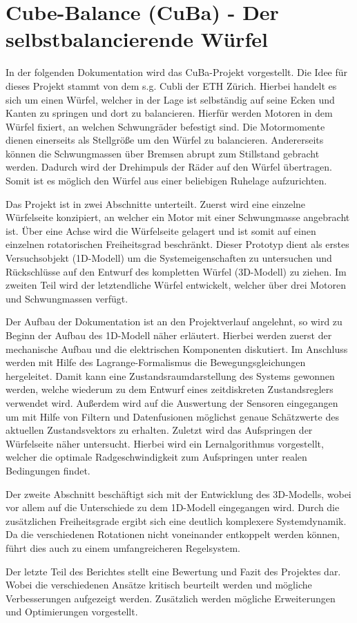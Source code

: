 \section{Cube-Balance (CuBa) - Der selbstbalancierende Würfel}
In der folgenden Dokumentation wird das CuBa-Projekt vorgestellt. Die Idee für dieses Projekt stammt von dem s.g. Cubli der ETH Zürich. Hierbei handelt es sich um einen Würfel, welcher in der Lage ist selbständig auf seine Ecken und Kanten zu springen und dort zu balancieren. Hierfür werden Motoren in dem Würfel fixiert, an welchen Schwungräder befestigt sind. Die Motormomente dienen einerseits als Stellgröße um den Würfel zu balancieren. Andererseits können die Schwungmassen über Bremsen abrupt zum Stillstand gebracht werden. Dadurch wird der Drehimpuls der Räder auf den Würfel übertragen. Somit ist es möglich den Würfel aus einer beliebigen Ruhelage aufzurichten.
\newline

Das Projekt ist in zwei Abschnitte unterteilt. Zuerst wird eine einzelne Würfelseite konzipiert, an welcher ein Motor mit einer Schwungmasse angebracht ist. Über eine Achse wird die Würfelseite gelagert und ist somit auf einen einzelnen rotatorischen Freiheitsgrad beschränkt. Dieser Prototyp dient als erstes Versuchsobjekt (1D-Modell) um die Systemeigenschaften zu untersuchen und Rückschlüsse auf den Entwurf des kompletten Würfel (3D-Modell) zu ziehen. Im zweiten Teil wird der letztendliche Würfel entwickelt, welcher über drei Motoren und Schwungmassen verfügt.
\newline

Der Aufbau der Dokumentation ist an den Projektverlauf angelehnt, so wird zu Beginn der Aufbau des 1D-Modell näher erläutert. Hierbei werden zuerst der mechanische Aufbau und die elektrischen Komponenten diskutiert. Im Anschluss werden mit Hilfe des Lagrange-Formalismus die Bewegungsgleichungen hergeleitet. Damit kann eine Zustandsraumdarstellung des Systems gewonnen werden, welche wiederum zu dem Entwurf eines zeitdiskreten Zustandsreglers verwendet wird. Außerdem wird auf die Auswertung der Sensoren eingegangen um mit Hilfe von Filtern und Datenfusionen möglichst genaue Schätzwerte des aktuellen Zustandsvektors zu erhalten. Zuletzt wird das Aufspringen der Würfelseite näher untersucht. Hierbei wird ein Lernalgorithmus vorgestellt, welcher die optimale Radgeschwindigkeit zum Aufspringen unter realen Bedingungen findet.
\newline

Der zweite Abschnitt beschäftigt sich mit der Entwicklung des 3D-Modells, wobei vor allem auf die Unterschiede zu dem 1D-Modell eingegangen wird. Durch die zusätzlichen Freiheitsgrade ergibt sich eine deutlich komplexere Systemdynamik. Da die verschiedenen Rotationen nicht voneinander entkoppelt werden können, führt dies auch zu einem umfangreicheren Regelsystem. 

Der letzte Teil des Berichtes stellt eine Bewertung und Fazit des Projektes dar. Wobei die verschiedenen Ansätze kritisch beurteilt werden und mögliche Verbesserungen aufgezeigt werden. Zusätzlich werden mögliche Erweiterungen und Optimierungen vorgestellt.

